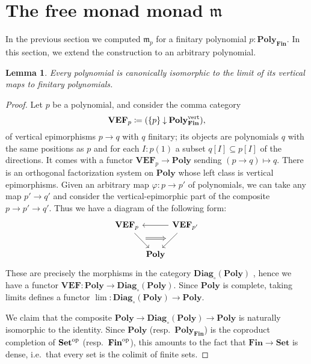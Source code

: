 \documentclass[11pt, one side, article]{memoir}
\theoremstyle{definition}
\theoremstyle{plain}
\newtheorem{lemma}[definitionx]{Lemma}
\renewcommand{\ss}{\subseteq}
\newcommand{\Cat}[1]{\mathbf{#1}}%
\newcommand{\down}{\mathbin{\downarrow}}
\newcommand{\op}{^\tn{op}}
\newcommand{\tn}[1]{\textnormal{#1}}
\newcommand{\finset}{\Cat{Fin}}
\newcommand{\smset}{\Cat{Set}}
\newcommand{\polyfin}{\poly_{\finset}}
\newcommand{\poly}{\Cat{Poly}}
\newcommand{\free}{\mathfrak{m}}
\newcommand{\diag}{\Cat{Diag}}
\newcommand{\VEF}{\Cat{VEF}}
\begin{document}
\section{The free monad monad $\free$}

In the previous section we computed $\free_p$ for a finitary polynomial $p:\polyfin$. In this section, we extend the construction to an arbitrary polynomial.

\begin{lemma}\label{lemma.vert_lim}
Every polynomial is canonically isomorphic to the limit of its vertical maps to finitary polynomials.
\end{lemma}
\begin{proof}
Let $p$ be a polynomial, and consider the comma category
\[\VEF_p\coloneqq(\{p\}\down\polyfin^\tn{vert}),\]
of vertical epimorphisms $p\to q$ with $q$ finitary; its objects are polynomials $q$ with the same positions as $p$ and for each $I:p(1)$ a subset $q[I]\ss p[I]$ of the directions. It comes with a functor $\VEF_p\to\poly$ sending $(p\to q)\mapsto q$. There is an orthogonal factorization system on $\poly$ whose left class is vertical epimorphisms. Given an arbitrary map $\varphi\colon p\to p'$ of polynomials, we can take any map $p'\to q'$ and consider the vertical-epimorphic part of the composite $p\to p'\to q'$. Thus we have a diagram of the following form:
\[
\begin{tikzcd}[column sep=0pt]
	\VEF_p\ar[dr, "" name=p]&&\VEF_{p'}\ar[dl, ""' name=p']\ar[ll]\\&
	\poly
	\ar[from=p, to=p', Rightarrow]
\end{tikzcd}
\]
These are precisely the morphisms in the category $\diag_\circ(\poly)$ \cite{peschke2021diagrams}, hence we have a functor $\VEF\colon\poly\to\diag_\circ(\poly)$. Since $\poly$ is complete, taking limits defines a functor $\lim\colon\diag_\circ(\poly)\to\poly$. 

We claim that the composite $\poly\to\diag_\circ(\poly)\to\poly$ is naturally isomorphic to the identity. Since $\poly$ (resp.\ $\polyfin$) is the coproduct completion of $\smset\op$ (resp.\ $\finset\op$), this amounts to the fact that $\finset\to\smset$ is dense, i.e.\ that every set is the colimit of finite sets. 
\end{proof}
\end{document}
